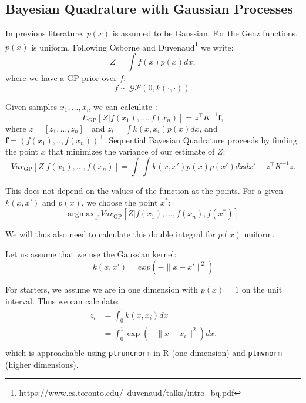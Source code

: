 \subsection*{Bayesian Quadrature with Gaussian Processes}
In previous literature, $p(x)$ is assumed to be Gaussian. For the Genz functions, $p(x)$ is uniform. Following Osborne \cite{GPSQ} and Duvenaud\footnote{https://www.cs.toronto.edu/~duvenaud/talks/intro\_bq.pdf} we write:
\begin{equation}
    Z = \int f(x) p(x) dx,
\label{eqn:BQwithGP}
\end{equation}
where we have a GP prior over $f$:
\begin{equation}
    f \sim \mathcal{GP}(0,k(\cdot,\cdot)).
\end{equation}
    
Given samples $x_1, \ldots, x_n$ we can calculate \cite{Rasmussen:2005:GPM:1162254}:
\begin{equation}
    E_{\mbox{GP}}\left[Z | f(x_1), \ldots, f(x_n)\right] = z^{\top} K^{-1}\pmb{f},
\end{equation}
where $z = [z_1, \ldots, z_n]^{\top}$ and $z_i = \int k(x,x_i)p(x)dx$, and $\pmb{f} = (f(x_1),..,f(x_n))^{\top}$. 
Sequential Bayesian Quadrature proceeds by finding the point $x$ that minimizes the variance of our estimate of $Z$:
\begin{equation}
    Var_{\mbox{GP}}\left[Z | f(x_1), \ldots, f(x_n)\right] = \int \int k(x,x')p(x)p(x')dxdx' - z^{\top}K^{-1}z. 
\end{equation}

This does not depend on the values of the function at the points. For a given $k(x,x')$ and $p(x)$, we choose the point $x^*$:
\begin{equation}
    \mbox{argmax}_{x^*} Var_{\mbox{GP}}\left[Z | f(x_1), \ldots, f(x_n), f(x^*) \right] 
\end{equation}

We will thus also need to calculate this double integral for $p(x)$ uniform.

Let us assume that we use the Gaussian kernel:
\begin{equation}
    k(x,x') = exp(-\|x-x'\|^2)
\end{equation}

For starters, we assume we are in one dimension with $p(x) = 1$ on the unit interval.
Thus we can calculate:
\begin{align}
    z_i & = \int_{0}^1 k(x,x_i) dx \\
    & = \int_0^1 \exp(-\|x-x_i\|^2) dx. \\
\end{align}
which is approachable using \texttt{ptruncnorm} in R (one dimension) and \texttt{ptmvnorm} (higher dimensions).

